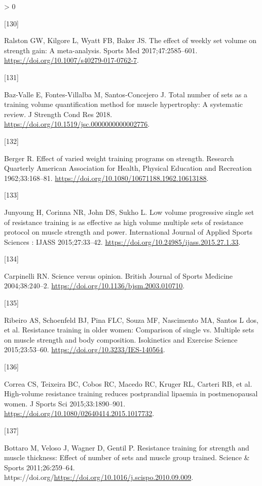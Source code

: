 \documentclass[twoside,10pt]{gihclass} %
\newlength{\cslhangindent}
\newlength{\csllabelwidth}
\newenvironment{CSLReferences}[3] %
 {%
  \setlength{\parindent}{0pt}
  \ifodd #1 \everypar{\setlength{\hangindent}{\cslhangindent}}\ignorespaces\fi
  \ifnum #2 > 0
  \setlength{\parskip}{#2\baselineskip}
  \fi
 }%
 {}
\newcommand{\CSLLeftMargin}[1]{\parbox[t]{\maxof{\widthof{#1}}{\csllabelwidth}}{#1}}
\newcommand{\CSLRightInline}[1]{\parbox[t]{\linewidth}{#1}}
\begin{document}
\begin{CSLReferences}{0}{0}
\leavevmode\hypertarget{ref-RN2492}{}%
\CSLLeftMargin{{[}130{]} }
\CSLRightInline{Ralston GW, Kilgore L, Wyatt FB, Baker JS. The effect of weekly set volume on strength gain: A meta-analysis. Sports Med 2017;47:2585--601. \url{https://doi.org/10.1007/s40279-017-0762-7}.}

\leavevmode\hypertarget{ref-RN2130}{}%
\CSLLeftMargin{{[}131{]} }
\CSLRightInline{Baz-Valle E, Fontes-Villalba M, Santos-Concejero J. Total number of sets as a training volume quantification method for muscle hypertrophy: A systematic review. J Strength Cond Res 2018. \url{https://doi.org/10.1519/jsc.0000000000002776}.}

\leavevmode\hypertarget{ref-RN1476}{}%
\CSLLeftMargin{{[}132{]} }
\CSLRightInline{Berger R. Effect of varied weight training programs on strength. Research Quarterly American Association for Health, Physical Education and Recreation 1962;33:168--81. \url{https://doi.org/10.1080/10671188.1962.10613188}.}

\leavevmode\hypertarget{ref-RN2568}{}%
\CSLLeftMargin{{[}133{]} }
\CSLRightInline{Junyoung H, Corinna NR, John DS, Sukho L. Low volume progressive single set of resistance training is as effective as high volume multiple sets of resistance protocol on muscle strength and power. International Journal of Applied Sports Sciences : IJASS 2015;27:33--42. \url{https://doi.org/10.24985/ijass.2015.27.1.33}.}

\leavevmode\hypertarget{ref-RN2201}{}%
\CSLLeftMargin{{[}134{]} }
\CSLRightInline{Carpinelli RN. Science versus opinion. British Journal of Sports Medicine 2004;38:240--2. \url{https://doi.org/10.1136/bjsm.2003.010710}.}

\leavevmode\hypertarget{ref-RN2465}{}%
\CSLLeftMargin{{[}135{]} }
\CSLRightInline{Ribeiro AS, Schoenfeld BJ, Pina FLC, Souza MF, Nascimento MA, Santos L dos, et al. Resistance training in older women: Comparison of single vs. Multiple sets on muscle strength and body composition. Isokinetics and Exercise Science 2015;23:53--60. \url{https://doi.org/10.3233/IES-140564}.}

\leavevmode\hypertarget{ref-RN2464}{}%
\CSLLeftMargin{{[}136{]} }
\CSLRightInline{Correa CS, Teixeira BC, Cobos RC, Macedo RC, Kruger RL, Carteri RB, et al. High-volume resistance training reduces postprandial lipaemia in postmenopausal women. J Sports Sci 2015;33:1890--901. \url{https://doi.org/10.1080/02640414.2015.1017732}.}

\leavevmode\hypertarget{ref-RN2463}{}%
\CSLLeftMargin{{[}137{]} }
\CSLRightInline{Bottaro M, Veloso J, Wagner D, Gentil P. Resistance training for strength and muscle thickness: Effect of number of sets and muscle group trained. Science \& Sports 2011;26:259--64. https://doi.org/\url{https://doi.org/10.1016/j.scispo.2010.09.009}.}


\end{CSLReferences}
\end{document}
